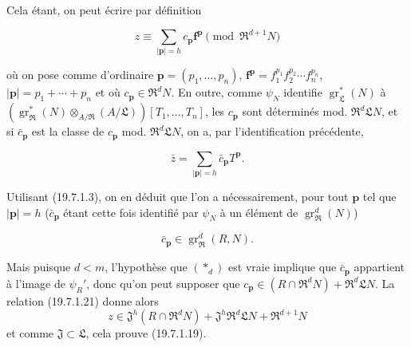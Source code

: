 Cela étant, on peut écrire par définition
\begin{env}[19.7.1.21]
\label{IV.19.7.1.21}
\[
  z\equiv\sum_{|\mathbf p|=h}c_{\mathbf p}\mathbf f^{\mathbf p}\pmod{\mathfrak R^{d+1}N}
\]
\end{env}
où on pose comme d'ordinaire $\mathbf p=(p_1,\ldots,p_n)$, $\mathbf f^{\mathbf p}=f_1^{p_1}f_2^{p_2}\cdots f_n^{p_n}$, $|\mathbf p|=p_1+\cdots+p_n$ et où $c_{\mathbf p}\in\mathfrak R^dN$. En outre, comme $\psi_N$ identifie $\operatorname{gr}_{\mathfrak L}^*(N)$ à $(\operatorname{gr}_{\mathfrak R}^*(N)\otimes_{A/\mathfrak R}(A/\mathfrak L))[T_1,\ldots,T_n]$, les $c_{\mathbf p}$ sont déterminés mod. $\mathfrak R^d\mathfrak LN$, et si $\bar c_{\mathbf p}$ est la classe de $c_{\mathbf p}$ mod. $\mathfrak R^d\mathfrak LN$, on a, par l'identification précédente,
\begin{env}[19.7.1.22]
\label{IV.19.7.1.22}
\[
  \bar z=\sum_{|\mathbf p|=h}\bar c_{\mathbf p}T^{\mathbf p}.
\]
\end{env}
Utilisant (19.7.1.3), on en déduit que l'on a nécessairement, pour tout $\mathbf p$ tel que $|\mathbf p|=h$ ($\bar c_{\mathbf p}$ étant cette fois identifié par $\psi_N$ à un élément de $\operatorname{gr}_{\mathfrak R}^d(N)$)
\begin{env}[19.7.1.23]
\label{IV.19.7.1.23}
\[
  \bar c_{\mathbf p}\in\operatorname{gr}_{\mathfrak R}^d(R,N).
\]
\end{env}
Mais puisque $d<m$, l'hypothèse que $(*_d)$ est vraie implique que $\bar c_{\mathbf p}$ appartient à l'image de $\psi_R'$, donc qu'on peut supposer que $c_{\mathbf p}\in(R\cap\mathfrak R^dN)+\mathfrak R^d\mathfrak LN$. La relation (19.7.1.21) donne alors
\[
  z\in\mathfrak J^h(R\cap\mathfrak R^dN)+\mathfrak J^h\mathfrak R^d\mathfrak LN+\mathfrak R^{d+1}N
\]
et comme $\mathfrak J\subset\mathfrak L$, cela prouve (19.7.1.19).

